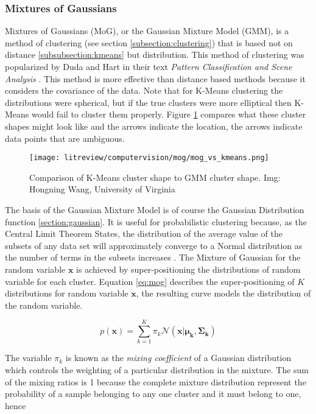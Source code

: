 \subsubsection{Mixtures of Gaussians}
 \label{subsection:mog}

Mixtures of Gaussians (MoG), or the Gaussian Mixture Model (GMM), is a method of clustering (see section \ref{subsection:clustering}) that is based not on distance \ref{subsubsection:kmeans} but distribution. This method of clustering was popularized by Duda and Hart in their text \emph{Pattern Classification and Scene Analysis} \cite{mog_seminal}. This method is more effective than distance based methods because it considers the covariance of the data. Note that for K-Means clustering the distributions were spherical, but if the true clusters were more elliptical then K-Means would fail to cluster them properly. Figure \ref{fig:cluster_shapes} compares what these cluster shapes might look like and the arrows indicate the location, the arrows indicate data points that are ambiguous.

\begin{figure}[ht]
	\centering
	\texttt{[image: litreview/computervision/mog/mog\_vs\_kmeans.png]}
	\captionsetup{format = hang}
	\caption{Comparison of K-Means cluster shape to GMM cluster shape. Img: Hongning Wang, University of Virginia }
	\label{fig:cluster_shapes}
\end{figure}
	
The basis of the Gaussian Mixture Model is of course the Gaussian Distribution function \ref{section:gaussian}. It is useful for probabilistic clustering because, as the Central Limit Theorem States, the distribution of the average value of the subsets of any data set will approximately converge to a Normal distribution as the number of terms in the subsets increases \cite{patterns_machine_learning}. The Mixture of Gaussian for the random variable $\boldsymbol{x}$ is achieved by super-positioning the distributions of random variable for each cluster. Equation \ref{eq:mog} describes the super-positioning of $K$ distributions for random variable $\boldsymbol{x}$, the resulting curve models the distribution of the random variable. 

\begin{equation}
p(\boldsymbol{x}) = \sum^{K}_{k = 1}\pi_k \mathcal{N}(\boldsymbol{x}|\boldsymbol{\mu_k}, \boldsymbol{\Sigma_k})
\label{eq:mog}
\end{equation}

The variable $\pi_k$ is known as the \emph{mixing coefficient} of a Gaussian distribution which controls the weighting of a particular distribution in the mixture. The sum of the mixing ratios is 1 because the complete mixture distribution represent the probability of a sample belonging to any one cluster and it must belong to one, hence

